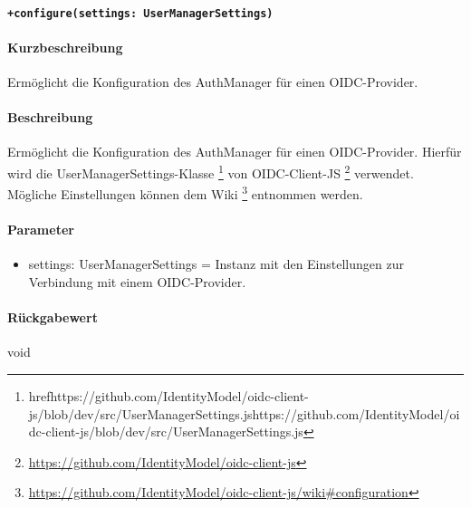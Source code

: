 \paragraph{\texttt{+configure(settings: UserManagerSettings)}}%
\paragraph*{Kurzbeschreibung}
Ermöglicht die Konfiguration des AuthManager für einen OIDC-Provider.
\paragraph*{Beschreibung}
Ermöglicht die Konfiguration des AuthManager für einen OIDC-Provider.
Hierfür wird die UserManagerSettings-Klasse \footnote{href{https://github.com/IdentityModel/oidc-client-js/blob/dev/src/UserManagerSettings.js}{https://github.com/IdentityModel/oidc-client-js/blob/dev/src/UserManagerSettings.js}} von 
OIDC-Client-JS \footnote{\href{https://github.com/IdentityModel/oidc-client-js}{https://github.com/IdentityModel/oidc-client-js}} verwendet.
Mögliche Einstellungen können dem Wiki \footnote{\href{https://github.com/IdentityModel/oidc-client-js/wiki\#configuration}{https://github.com/IdentityModel/oidc-client-js/wiki\#configuration}} entnommen werden.
\paragraph*{Parameter}
\begin{itemize}
    \item settings: UserManagerSettings = Instanz mit den Einstellungen zur Verbindung mit einem OIDC-Provider.
\end{itemize}
\paragraph*{Rückgabewert}
void
